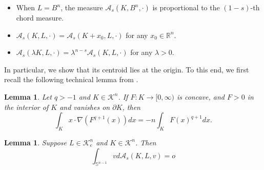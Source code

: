 \documentclass[12pt, oneside,reqno]{amsart}
\numberwithin{equation}{section}
\newtheorem{lemma}[theorem]{Lemma}
\newtheorem{definition and theorem}[theorem]{Definition and Theorem}
\newcommand{\tA}{\mathcal{A}_s}
\theoremstyle{plain}
\theoremstyle{remark}
\theoremstyle{definition}
\newcommand{\sn}{{\mathbb S}^{n-1}}
\newcommand{\rn}{\mathbb R^n}
\newcommand{\tk}{\mathcal{K}}
\begin{document}
\begin{itemize}[itemsep=5pt, label=\scriptsize$\bullet$]
    \item When $L=B^n$, the measure $\tA(K,B^n,\cdot)$ is proportional to the $(1-s)$-th chord measure.
    \item $\tA(K,L,\cdot)=\tA(K+x_0,L,\cdot)$ for any $x_0\in\rn$.
    \item $\tA(\lambda K,L,\cdot)=\lambda^{n-s}\tA(K,L,\cdot)$ for any $\lambda>0$.
\end{itemize}

 In particular, we show that its centroid lies at the origin. To this end, we first recall the following technical lemma from \cite{XZ}.


\begin{lemma}\cite[Lemma 3.2]{XZ}\label{xz-lem1}
    Let $q>-1$ and $K\in\tk^n$. If $F:K\rightarrow [0,\infty)$ is concave, and $F>0$ in the interior of $K$ and vanishes on $\partial K$, then
    \[\int_K  x\cdot  \nabla (F^{q+1}(x)) dx=-n\int_{K} F(x)^{q+1} dx.\]
\end{lemma}

\begin{lemma}\label{centroid}
    Suppose $L\in\tk_e^n$ and $K\in\tk^n$. Then
    \[\int_{\sn}v d\mathcal{A}_s(K,L,v)=o\]
\end{lemma}
\end{document}

